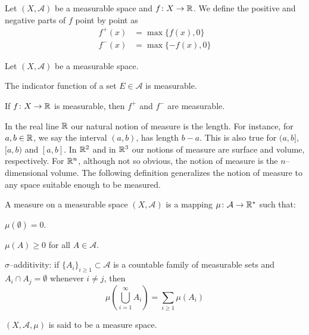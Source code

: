 \begin{definition*}
	Let $(X, \mathcal{A})$ be a measurable space and $f \colon X \rightarrow
	\mathbb{R}$. We define the positive and negative parts of $f$ point by point as
	\begin{align*}
		f^+(x) &= \max{\{ f(x), 0 \}} \\
		f^-(x) &= \max{\{ -f(x), 0 \}}
	\end{align*}
\end{definition*}

\begin{prop}
	Let $(X, \mathcal{A})$ be a measurable space.
	\begin{enumerateprop}
		\item The indicator function of a set $E \in \mathcal{A}$ is measurable.
		\item If $f \colon X \rightarrow \mathbb{R}$ is measurable, then $f^+$ and $f^-$ are measurable.
	\end{enumerateprop}
\end{prop}

In the real line $\mathbb{R}$ our natural notion of measure is the length. For
instance, for $a, b \in \mathbb{R}$, we say the interval $(a, b)$, has length $b -
a$. This is also true for $(a, b]$, $[a, b)$ and $[a,b]$. In $\mathbb{R}^2$ and in
$\mathbb{R}^3$ our notions of measure are surface and volume, respectively. For
$\mathbb{R}^n$, although not so obvious, the notion of measure is the
$n$--dimensional volume. The following definition generalizes the notion of
measure to any space suitable enough to be measured.

\begin{definition*}
	A measure on a measurable space $(X, \mathcal{A})$ is a mapping $\mu \colon
	\mathcal{A} \rightarrow \mathbb{R}^\ast$ such that:
	\begin{enumeratedef}
		\item $\mu(\emptyset) = 0$.
		\item $\mu(A) \geq 0$ for all $A \in \mathcal{A}$.
		\item $\sigma$--additivity: if $\{ A_i \}_{i \geq 1} \subset \mathcal{A}$ is a countable
		family of measurable sets and $A_i \cap A_j = \emptyset$ whenever $i \neq j$, then
		\[
			\mu\left( \displaystyle\bigcup_{i = 1}^\infty A_i \right) = \sum_{i \geq 1} \mu(A_i)	
		\]
	\end{enumeratedef}
	$(X, \mathcal{A}, \mu)$ is said to be a measure space.
\end{definition*}

